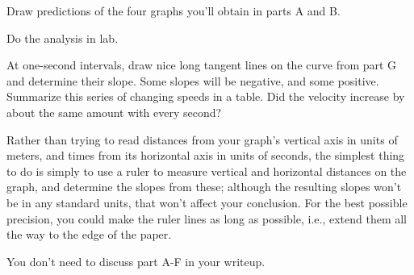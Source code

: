 \prelab

\prelabquestion  Draw predictions of the four graphs you'll obtain in parts A
and B.

\selfcheck

Do the analysis in lab.

\analysis

At one-second intervals, draw nice long tangent lines on the
curve from part G and determine their slope. Some slopes
will be negative, and some positive.  Summarize this series
of changing speeds in a table. Did the velocity increase by
about the same amount with every second?

Rather than trying to read distances from your graph's vertical axis in units
of meters, and times from its horizontal axis in units of seconds,
the simplest thing to do is simply to use a ruler to
measure vertical and horizontal distances on the graph, and determine the slopes
from these; although the resulting slopes won't be in any standard
units, that won't affect your conclusion. For the best possible precision,
you could make the ruler lines as long as possible, i.e., extend them all
the way to the edge of the paper.

You don't need to discuss part A-F in your writeup.
